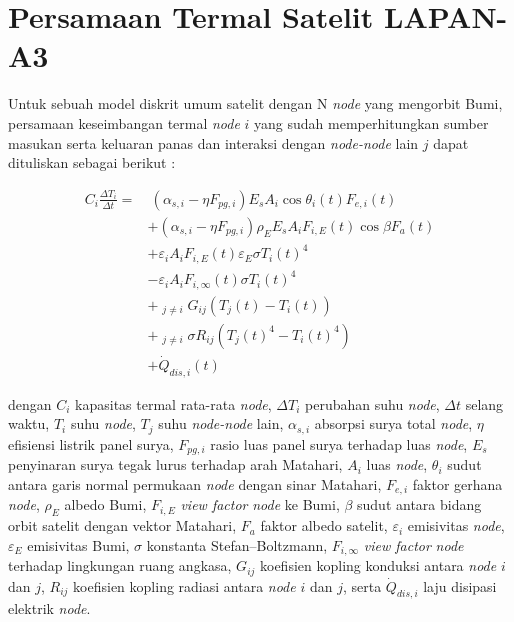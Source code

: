 \section{Persamaan Termal Satelit LAPAN-A3}

Untuk sebuah model diskrit umum satelit dengan N \textit{node} yang mengorbit
Bumi, persamaan keseimbangan termal \textit{node} $i$ yang sudah
memperhitungkan sumber masukan serta keluaran panas dan interaksi dengan
\textit{node-node} lain $j$ dapat dituliskan sebagai berikut
\cite{martinez2022}:

\begin{equation}
\label{eq:raweq}
\begin{split}
	C_{i} \frac{\Delta T_i}{\Delta t} = &\ \left(\alpha_{s,i} - \eta F_{pg,i}\right) E_s A_i \cos{\theta_{i}(t)} F_{e,i}(t) \\
	&+ \left(\alpha_{s,i} - \eta F_{pg,i}\right)\rho_{E} E_s A_i F_{i,E}(t) \cos{\beta} F_a(t) \\
	&+ \varepsilon_i A_i F_{i,E}(t) \varepsilon_E \sigma T_{i}(t)^4 \\
	&- \varepsilon_i A_i F_{i,\infty}(t) \sigma T_{i}(t)^4 \\
	&+ \mathop{\sum_{j=1}^{N}}_{j \neq i} G_{ij} \left(T_j(t) - T_i(t)\right) \\
	&+ \mathop{\sum_{j=1}^{N}}_{j \neq i} \sigma R_{ij}(T_{j}(t)^4-T_{i}(t)^4) \\
	&+ \dot{Q}_{dis,i}(t)
\end{split}
\end{equation}

dengan $C_i$ kapasitas termal rata-rata \textit{node}, $\Delta T_i$ perubahan suhu \textit{node},
$\Delta t$ selang waktu, $T_i$ suhu \textit{node}, $T_j$ suhu \textit{node-node} lain,
$\alpha_{s,i}$ absorpsi surya total \textit{node}, $\eta$ efisiensi listrik panel surya,
$F_{pg,i}$ rasio luas panel surya terhadap luas \textit{node}, $E_s$ penyinaran surya
tegak lurus terhadap arah Matahari, $A_i$ luas \textit{node}, $\theta_i$ sudut antara
garis normal permukaan \textit{node} dengan sinar Matahari, $F_{e,i}$ faktor gerhana
\textit{node}, $\rho_E$ albedo Bumi, $F_{i,E}$ \textit{view factor} \textit{node} ke Bumi, $\beta$ sudut
antara bidang orbit satelit dengan vektor Matahari, $F_a$ faktor albedo
satelit, $\varepsilon_i$ emisivitas \textit{node}, $\varepsilon_E$ emisivitas Bumi, $\sigma$
konstanta Stefan–Boltzmann, $F_{i,\infty}$ \textit{view factor} \textit{node} terhadap
lingkungan ruang angkasa, $G_{ij}$ koefisien kopling konduksi antara \textit{node} $i$
dan $j$, $R_{ij}$ koefisien kopling radiasi antara \textit{node} $i$ dan $j$, serta
$\dot{Q}_{dis,i}$ laju disipasi elektrik \textit{node}.

